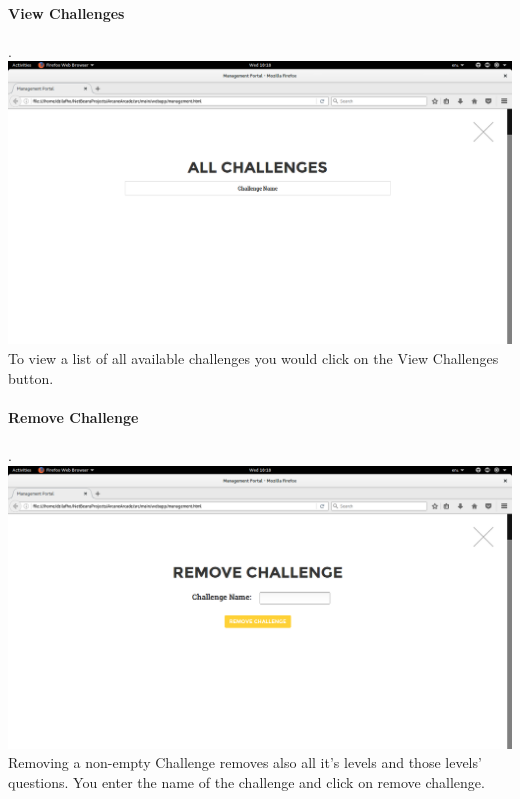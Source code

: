 \documentclass[english]{article}
\begin{document}
				\paragraph{View Challenges}. \\ \newline
				\includegraphics[width=\linewidth]{ViewChallenges.png}				\newline
				To view a list of all available challenges you would click on the View Challenges button.\newline


				\paragraph{Remove Challenge}. \\ \newline
				\includegraphics[width=\linewidth]{RemoveChallenge.png}				\newline
				Removing a non-empty Challenge removes also all it's levels and those levels' questions. You enter the name of the challenge and click on remove challenge.
				\\[12pt]
			
\end{document}
